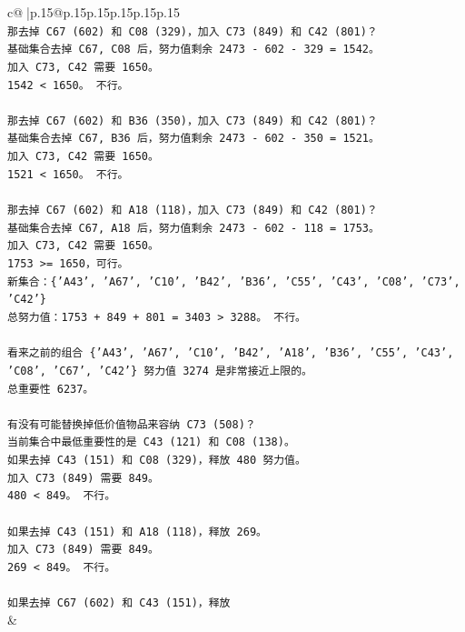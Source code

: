 \documentclass{article}
\begin{document}
{\begin{supertabular}{c@{$\;$}|p{.15\linewidth}@{}p{.15\linewidth}p{.15\linewidth}p{.15\linewidth}p{.15\linewidth}p{.15\linewidth}}
{{{\\ 
\texttt{那去掉 C67 (602) 和 C08 (329)，加入 C73 (849) 和 C42 (801)？} \\
\texttt{基础集合去掉 C67, C08 后，努力值剩余 2473 {-} 602 {-} 329 = 1542。} \\
\texttt{加入 C73, C42 需要 1650。} \\
\texttt{1542 < 1650。 不行。} \\
\\ 
\texttt{那去掉 C67 (602) 和 B36 (350)，加入 C73 (849) 和 C42 (801)？} \\
\texttt{基础集合去掉 C67, B36 后，努力值剩余 2473 {-} 602 {-} 350 = 1521。} \\
\texttt{加入 C73, C42 需要 1650。} \\
\texttt{1521 < 1650。 不行。} \\
\\ 
\texttt{那去掉 C67 (602) 和 A18 (118)，加入 C73 (849) 和 C42 (801)？} \\
\texttt{基础集合去掉 C67, A18 后，努力值剩余 2473 {-} 602 {-} 118 = 1753。} \\
\texttt{加入 C73, C42 需要 1650。} \\
\texttt{1753 >= 1650，可行。} \\
\texttt{新集合：\{'A43', 'A67', 'C10', 'B42', 'B36', 'C55', 'C43', 'C08', 'C73', 'C42'\}} \\
\texttt{总努力值：1753 + 849 + 801 = 3403 > 3288。 不行。} \\
\\ 
\texttt{看来之前的组合 \{'A43', 'A67', 'C10', 'B42', 'A18', 'B36', 'C55', 'C43', 'C08', 'C67', 'C42'\} 努力值 3274 是非常接近上限的。} \\
\texttt{总重要性 6237。} \\
\\ 
\texttt{有没有可能替换掉低价值物品来容纳 C73 (508)？} \\
\texttt{当前集合中最低重要性的是 C43 (121) 和 C08 (138)。} \\
\texttt{如果去掉 C43 (151) 和 C08 (329)，释放 480 努力值。} \\
\texttt{加入 C73 (849) 需要 849。} \\
\texttt{480 < 849。 不行。} \\
\\ 
\texttt{如果去掉 C43 (151) 和 A18 (118)，释放 269。} \\
\texttt{加入 C73 (849) 需要 849。} \\
\texttt{269 < 849。 不行。} \\
\\ 
\texttt{如果去掉 C67 (602) 和 C43 (151)，释放} \\
            }
        }
    }
    & \\ \\


\end{supertabular}}
\end{document}
